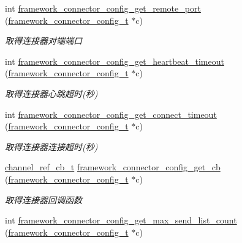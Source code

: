 \begin{DoxyCompactItemize}
int \hyperlink{a00055_a431430a477e5bd3b2f5d1cdd086d9e26_a431430a477e5bd3b2f5d1cdd086d9e26}{framework\+\_\+connector\+\_\+config\+\_\+get\+\_\+remote\+\_\+port} (\hyperlink{a00051_a81253f4c995b97e69be0e67f7a26097f_a81253f4c995b97e69be0e67f7a26097f}{framework\+\_\+connector\+\_\+config\+\_\+t} $\ast$c)
\begin{DoxyCompactList}\small\item\em 取得连接器对端端口 \end{DoxyCompactList}\item 
int \hyperlink{a00055_a09b5a84e743f5631978265baa74fc9df_a09b5a84e743f5631978265baa74fc9df}{framework\+\_\+connector\+\_\+config\+\_\+get\+\_\+heartbeat\+\_\+timeout} (\hyperlink{a00051_a81253f4c995b97e69be0e67f7a26097f_a81253f4c995b97e69be0e67f7a26097f}{framework\+\_\+connector\+\_\+config\+\_\+t} $\ast$c)
\begin{DoxyCompactList}\small\item\em 取得连接器心跳超时(秒) \end{DoxyCompactList}\item 
int \hyperlink{a00055_a8ae50af498b76007307c7ef858dbe345_a8ae50af498b76007307c7ef858dbe345}{framework\+\_\+connector\+\_\+config\+\_\+get\+\_\+connect\+\_\+timeout} (\hyperlink{a00051_a81253f4c995b97e69be0e67f7a26097f_a81253f4c995b97e69be0e67f7a26097f}{framework\+\_\+connector\+\_\+config\+\_\+t} $\ast$c)
\begin{DoxyCompactList}\small\item\em 取得连接器连接超时(秒) \end{DoxyCompactList}\item 
\hyperlink{a00051_ae296ec4d1ce108960de8dcc423956a1d_ae296ec4d1ce108960de8dcc423956a1d}{channel\+\_\+ref\+\_\+cb\+\_\+t} \hyperlink{a00055_a234e77f6481ee4af04abce8951f0ea73_a234e77f6481ee4af04abce8951f0ea73}{framework\+\_\+connector\+\_\+config\+\_\+get\+\_\+cb} (\hyperlink{a00051_a81253f4c995b97e69be0e67f7a26097f_a81253f4c995b97e69be0e67f7a26097f}{framework\+\_\+connector\+\_\+config\+\_\+t} $\ast$c)
\begin{DoxyCompactList}\small\item\em 取得连接器回调函数 \end{DoxyCompactList}\item 
int \hyperlink{a00055_ae40086f0cb45ef48ed77c30dfb2a6655_ae40086f0cb45ef48ed77c30dfb2a6655}{framework\+\_\+connector\+\_\+config\+\_\+get\+\_\+max\+\_\+send\+\_\+list\+\_\+count} (\hyperlink{a00051_a81253f4c995b97e69be0e67f7a26097f_a81253f4c995b97e69be0e67f7a26097f}{framework\+\_\+connector\+\_\+config\+\_\+t} $\ast$c)

\end{DoxyCompactItemize}
